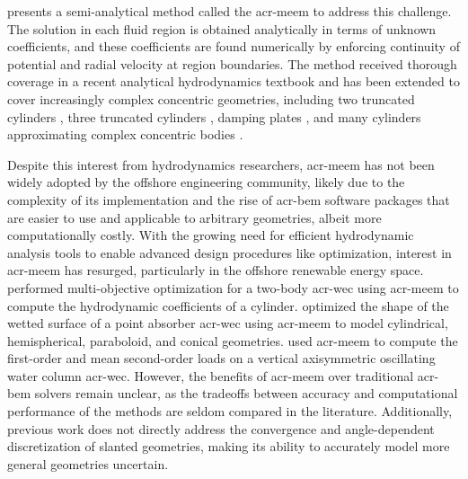 \documentclass[lineno]{JFM-FLM_Au}
\begin{document}
\citet{yeung_added_1981} presents a semi-analytical method called the \acrfull{acr-meem} to address this challenge.
The solution in each fluid region is obtained analytically in terms of unknown coefficients, and these coefficients are found numerically by enforcing continuity of potential and radial velocity at region boundaries.
The method received thorough coverage in a recent analytical hydrodynamics textbook \citep{chatzigeorgiou2018analytical} and has been extended to cover increasingly complex concentric geometries, 
including two truncated cylinders \citep{mavrakos_hydrodynamic_2004,chau2012inertia}, three truncated cylinders \citep{zhang_performance_2024}, damping plates \citep{olaya_hydrodynamic_2015}, and many cylinders approximating complex concentric bodies \citep{kokkinowrachos_behaviour_1986}.

Despite this interest from hydrodynamics researchers, \gls{acr-meem} has not been widely adopted by the offshore engineering community, likely due to the complexity of its implementation 
and the rise of \gls{acr-bem} software packages that are easier to use and applicable to arbitrary geometries, albeit more computationally costly.
With the growing need for efficient hydrodynamic analysis tools to enable advanced design procedures like optimization, interest in \gls{acr-meem} has resurged, particularly in the offshore renewable energy space. 
\citet{pavlidou_novel_2022} performed multi-objective optimization for a two-body \gls{acr-wec} using \gls{acr-meem} to compute the hydrodynamic coefficients of a cylinder. 
\citet{zhang_hydrodynamic_2016} optimized the shape of the wetted surface of a point absorber \gls{acr-wec} using \gls{acr-meem} to model cylindrical, hemispherical, paraboloid, and conical geometries. 
\citet{mavrakos_hydrodynamic_2012} used \gls{acr-meem} to compute the first-order and mean second-order loads on a vertical axisymmetric oscillating water column \gls{acr-wec}. 
However, the benefits of \gls{acr-meem} over traditional \gls{acr-bem} solvers remain unclear, as the tradeoffs between accuracy and computational performance of the methods are seldom compared in the literature. 
Additionally, previous work does not directly address the convergence \behaviour{} and angle-dependent discretization of slanted geometries, making its ability to accurately model more general geometries uncertain.
\end{document}
